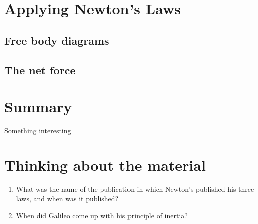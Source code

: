 \section{Applying Newton's Laws}

\subsection{Free body diagrams}
\subsection{The net force}


\newpage
\section{Summary}
\vspace{2cm}
\begin{chapterSummary}
\item Something interesting
\end{chapterSummary}

\section{Thinking about the material}

\begin{enumerate}
\item What was the name of the publication in which Newton's published his three laws, and when was it published?
\item When did Galileo come up with his principle of inertia?
\end{enumerate}